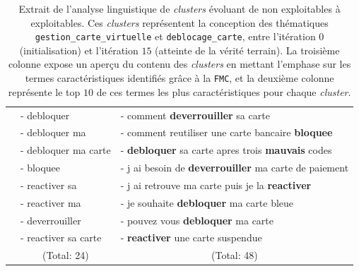 \begin{table}[!htb]
\begin{center}
\begin{tabular}{|c|l|l|}
						& { \scriptsize - debloquer }
						& { \scriptsize - comment \textbf{deverrouiller} sa carte }
						\tabularnewline
						
						& { \scriptsize - debloquer ma }
						& { \scriptsize - comment reutiliser une carte bancaire \textbf{bloquee} }
						\tabularnewline
						
						& { \scriptsize - debloquer ma carte }
						& { \scriptsize - \textbf{debloquer} sa carte apres trois \textbf{mauvais} codes }
						\tabularnewline
						
						& { \scriptsize - bloquee }
						& { \scriptsize - j ai besoin de \textbf{deverrouiller} ma carte de paiement }
						\tabularnewline
						
						& { \scriptsize - reactiver sa }
						& { \scriptsize - j ai retrouve ma carte puis je la \textbf{reactiver} }
						\tabularnewline
						
						& { \scriptsize - reactiver ma }
						& { \scriptsize - je souhaite \textbf{debloquer} ma carte bleue }
						\tabularnewline
						
						& { \scriptsize - deverrouiller }
						& { \scriptsize - pouvez vous \textbf{debloquer} ma carte }
						\tabularnewline
						
						& { \scriptsize - reactiver sa carte }
						& { \scriptsize - \textbf{reactiver} une carte suspendue }
						\tabularnewline
						
						& \multicolumn{1}{c|}{
							\scriptsize (Total: 24)
						}
						& \multicolumn{1}{c|}{
							\scriptsize (Total: 48)
						}
						\tabularnewline
						\hline
					
				\end{tabular}
				\end{center}
				\caption{Extrait de l'analyse linguistique de \textit{clusters} évoluant de non exploitables à exploitables.
				Ces \textit{clusters} représentent la conception des thématiques \texttt{gestion\_carte\_virtuelle} et \texttt{deblocage\_carte}, entre l'itération $0$ (initialisation) et l'itération $15$ (atteinte de la vérité terrain).
				La troisième colonne expose un aperçu du contenu des \textit{clusters} en mettant l'emphase sur les termes caractéristiques identifiés grâce à la \texttt{FMC}, et la deuxième colonne représente le top $10$ de ces termes les plus caractéristiques pour chaque \textit{cluster}.
				}
				\label{table:4.4.2-ETUDE-PERTINENCE-PATTERNS-LINGUISTIQUES-DEBLOCAGE-CARTE-GESTION-CARTE-VIRTUELLE}
			\end{table}

